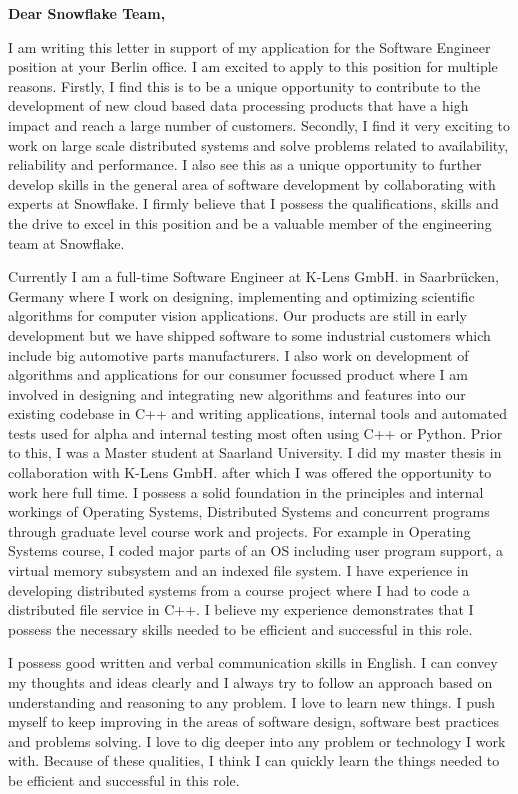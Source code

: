 \documentclass[letterpaper,11pt]{article}
\begin{document}
\textbf{Dear Snowflake Team,}
\vspace{1cm}


I am writing this letter in support of my application for the Software Engineer
position at your Berlin office. I am excited to apply to this position for multiple reasons. Firstly, I
find this is to be a unique opportunity to contribute to the development of
new cloud based data processing products that have a high impact and reach a
large number of customers.
Secondly, I find it very exciting to work on large scale distributed systems
and solve problems related to availability, reliability and performance.
I also see this as a unique opportunity to further develop skills in the general
area of software development by collaborating with experts at Snowflake.
I firmly believe that I possess the qualifications, skills and the drive to
excel in this position and be a valuable member of the engineering team at
Snowflake.

Currently I am a full-time Software Engineer at K-Lens GmbH. in Saarbr\"ucken,
Germany where I work on designing, implementing and
optimizing scientific algorithms for computer vision applications. Our products
are still in early development but we have shipped software to some industrial
customers which include big automotive parts manufacturers. I also work on
development of algorithms and applications for our consumer focussed
product where I am involved in designing and integrating new algorithms and features
into our existing codebase in C++ and writing applications, internal tools and
automated tests used for alpha and internal testing most often using C++
or Python. Prior to this, I was a Master student at Saarland University. I did my master thesis in
collaboration with K-Lens GmbH. after which I was offered the opportunity to
work here full time. I possess a solid foundation in the principles and
internal workings of Operating Systems, Distributed Systems and concurrent programs through graduate
level course work and projects. For example in Operating Systems
course, I coded major parts of an OS including user program support, a virtual
memory subsystem and an indexed file system. I have experience in developing
distributed systems from a course project where I had to code a distributed
file service in C++. I believe my experience demonstrates that I possess the
necessary skills needed to be efficient and successful in this role.

I possess good written and verbal communication skills in English. I can convey
my thoughts and ideas clearly and I always try to follow an approach based on
understanding and reasoning to any problem. I love to learn new things.
I push myself to keep improving in the areas of software design,
software best practices and problems solving. I love to dig deeper into any
problem or technology I work with. Because of these qualities, I think I can
quickly learn the things needed to be efficient and successful in this role.
\end{document}
